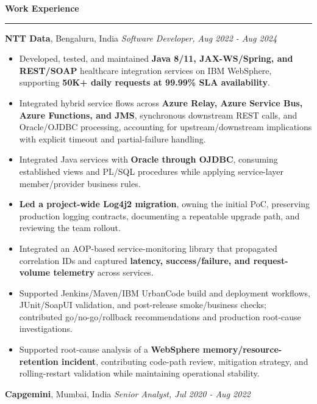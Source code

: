 \documentclass[11pt,letterpaper]{article}
\newcommand{\ressection}[1]{\Needspace{6\baselineskip}\vspace{8pt}\par\textbf{#1}\par\vspace{2pt}\hrule\vspace{5pt}}
\begin{document}
\ressection{Work Experience}
\textbf{NTT Data}, Bengaluru, India \hfill \textit{Software Developer, Aug 2022 - Aug 2024}
\begin{itemize}
  \item Developed, tested, and maintained \textbf{Java 8/11, JAX-WS/Spring, and REST/SOAP} healthcare integration services on IBM WebSphere, supporting \textbf{50K+ daily requests at 99.99\% SLA availability}.
  \item Integrated hybrid service flows across \textbf{Azure Relay, Azure Service Bus, Azure Functions, and JMS}, synchronous downstream REST calls, and Oracle/OJDBC processing, accounting for upstream/downstream implications with explicit timeout and partial-failure handling.
  \item Integrated Java services with \textbf{Oracle through OJDBC}, consuming established views and PL/SQL procedures while applying service-layer member/provider business rules.
  \item \textbf{Led a project-wide Log4j2 migration}, owning the initial PoC, preserving production logging contracts, documenting a repeatable upgrade path, and reviewing the team rollout.
  \item Integrated an AOP-based service-monitoring library that propagated correlation IDs and captured \textbf{latency, success/failure, and request-volume telemetry} across services.
  \item Supported Jenkins/Maven/IBM UrbanCode build and deployment workflows, JUnit/SoapUI validation, and post-release smoke/business checks; contributed go/no-go/rollback recommendations and production root-cause investigations.
  \item Supported root-cause analysis of a \textbf{WebSphere memory/resource-retention incident}, contributing code-path review, mitigation strategy, and rolling-restart validation while maintaining operational stability.
\end{itemize}
\textbf{Capgemini}, Mumbai, India \hfill \textit{Senior Analyst, Jul 2020 - Aug 2022}
\end{document}
